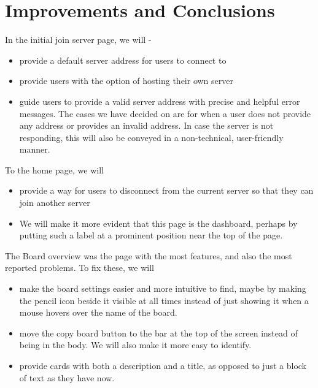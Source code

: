 \section{Improvements and Conclusions}


\vspace{2mm}

In the initial join server page, we will -
\begin{itemize}
    \item provide a default server address for users to connect to
    \item provide users with the option of hosting their own server
    \item guide users to provide a valid server address with precise and helpful error messages. The cases we have decided on are for when a user does not provide any address or provides an invalid address. In case the server is not responding, this will also be conveyed in a non-technical, user-friendly manner.
\end{itemize}

\vspace{2mm}

To the home page, we will
\begin{itemize}
    \item provide a way for users to disconnect from the current server so that they can join another server
    \item We will make it more evident that this page is the dashboard, perhaps by putting such a label at a prominent position near the top of the page.
\end{itemize}

\vspace{2mm}

The Board overview was the page with the most features, and also the most reported problems. To fix these, we will
\begin{itemize}
    \item make the board settings easier and more intuitive to find, maybe by making the pencil icon beside it visible at all times instead of just showing it when a mouse hovers over the name of the board.
    \item move the copy board button to the bar at the top of the screen instead of being in the body. We will also make it more easy to identify.
    \item provide cards with both a description and a title, as opposed to just a block of text as they have now.
\end{itemize}